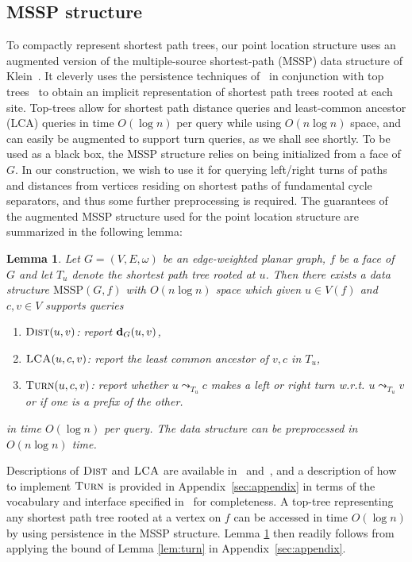 \documentclass[a4paper,UKenglish,cleveref, autoref, thm-restate]{article}
\newtheorem{lemma}{Lemma}
\newcommand{\dist}[2]{\ensuremath{\normalfont{\textbf{d}}_{#1}({#2})}}
\begin{document}
\subsection{MSSP structure}
To compactly represent shortest path trees, our point location structure uses an augmented version of the multiple-source shortest-path (MSSP) data structure of Klein~\cite{Klein2007}. It cleverly uses the persistence techniques of~\cite{Driscoll1989} in conjunction with top trees~\cite{Holm2003} to obtain an implicit representation of shortest path trees rooted at each site. Top-trees allow for shortest path distance queries and least-common ancestor (LCA) queries in time $O(\log n)$ per query while using $O(n \log n)$ space, and can easily be augmented to support turn queries, as we shall see shortly. To be used as a black box, the MSSP structure relies on being initialized from a face of $G$. In our construction, we wish to use it for querying left/right turns of paths and distances from vertices residing on shortest paths of fundamental cycle separators, and thus some further preprocessing is required. The guarantees of the augmented MSSP structure used for the point location structure are summarized in the following lemma:

\begin{lemma}\label{lem:klein-enhanced}
Let $G=(V,E,\omega)$ be an edge-weighted planar graph, $f$ be a face of $G$ and let $T_u$ denote the shortest path tree rooted at $u$. Then there exists a data structure $\text{MSSP}(G,f)$ with $O(n \log n)$ space which given $u \in V(f)$ and $c,v \in V$ supports queries
\begin{enumerate}
\item $\textsc{Dist}(u,v)$: report $\dist{G}{u,v}$,
\item $\textsc{LCA}(u,c,v)$: report the least common ancestor of $v,c$ in $T_u$,
\item $\textsc{Turn}(u,c,v)$: report whether $u \leadsto_{T_u} c$ makes a left or right turn w.r.t. $u \leadsto_{T_u} v$ or if one is a prefix of the other.
\end{enumerate}
in time $O(\log n)$ per query. The data structure can be preprocessed in $O(n \log n)$ time.
\end{lemma}

Descriptions of $\textsc{Dist}$ and $\textsc{LCA}$ are available in~\cite{Klein2007} and~\cite{Holm2003}, and a description of how to implement $\textsc{Turn}$ is provided in Appendix~\ref{sec:appendix} in terms of the vocabulary and interface specified in~\cite{Holm2003} for completeness. A top-tree representing any shortest path tree rooted at a vertex on $f$ can be accessed in time $O(\log n)$ by  using persistence in the MSSP structure. Lemma \ref{lem:klein-enhanced} then readily follows from applying the bound of Lemma \ref{lem:turn} in Appendix~\ref{sec:appendix}.
\end{document}
